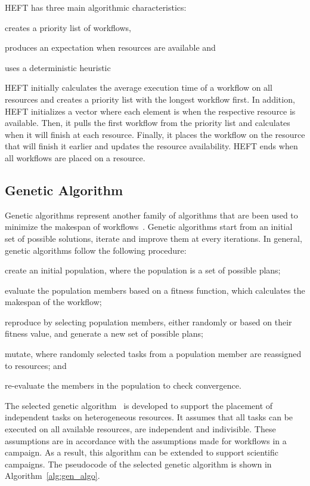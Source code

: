 HEFT has three main algorithmic characteristics:
\begin{inparaenum}[1)]
    \item creates a priority list of workflows,
    \item produces an expectation when resources are available and
    \item uses a deterministic heuristic
\end{inparaenum}
HEFT initially calculates the average execution time of a workflow on all resources and creates a priority list with the longest workflow first.
In addition, HEFT initializes a vector where each element is when the respective resource is available.
Then, it pulls the first workflow from the priority list and calculates when it will finish at each resource.
Finally, it places the workflow on the resource that will finish it earlier and updates the resource availability.
HEFT ends when all workflows are placed on a resource.

   
\subsection{Genetic Algorithm}
\label{algo:gen}
Genetic algorithms represent another family of algorithms that are been used to minimize the makespan of workflows~\cite{dong2006scheduling}.
Genetic algorithms start from an initial set of possible solutions, iterate and improve them at every iterations.
In general, genetic algorithms follow the following procedure:
\begin{inparaenum}[(i)]
    \item create an initial population, where the population is a set of possible plans;
    \item evaluate the population members based on a fitness function, which calculates the makespan of the workflow;
    \item reproduce by selecting population members, either randomly or based on their fitness value, and generate a new set of possible plans;
    \item mutate, where randomly selected tasks from a population member are reassigned to resources; and
    \item re-evaluate the members in the population to check convergence.
\end{inparaenum}

The selected genetic algorithm~\cite{page2005algorithm} is developed to support the placement of independent tasks on heterogeneous resources.
It assumes that all tasks can be executed on all available resources, are independent and indivisible.
These assumptions are in accordance with the assumptions made for workflows in a campaign.
As a result, this algorithm can be extended to support scientific campaigns.
The pseudocode of the selected genetic algorithm is shown in Algorithm~\ref{alg:gen_algo}.


